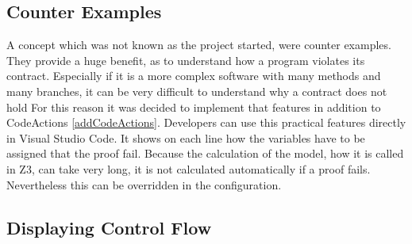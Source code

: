 \subsection{Counter Examples}
A concept which was not known as the project started, were counter examples. They provide a huge benefit, as to understand how a program violates its contract. Especially if it is a more complex software with many methods and many branches, it can be very difficult to understand why a contract does not hold\newline
For this reason it was decided to implement that features in addition to CodeActions \ref{addCodeActions}. 
Developers can use this practical features directly in Visual Studio Code. It shows on each line how the variables have to be assigned that the proof fail. \newline
Because the calculation of the model, how it is called in Z3, can take very long, it is not calculated automatically if a proof fails. Nevertheless this can be overridden in the configuration. 

 
\subsection{Displaying Control Flow}
